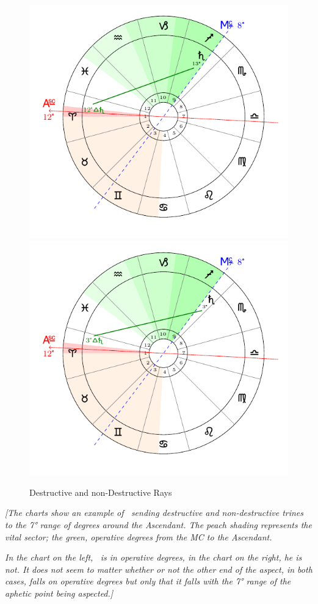 \begin{figure}[H]
\includegraphics[width=.48\textwidth]{charts/3_03_3a}
\includegraphics[width=.48\textwidth]{charts/3_03_3b}
\caption{Destructive and non-Destructive Rays}
\end{figure}

\textsl{[The charts show an example of \Saturn\, sending destructive and non-destructive trines to the 7° range of degrees around the Ascendant. The peach shading represents the vital sector; the green, operative degrees from the MC to the Ascendant.}

\textsl{In the chart on the left, \Saturn\, is in operative degrees, in the chart on the right, he is not. It does not seem to matter whether or not the other end of the aspect, in both cases, falls on operative degrees but only that it falls with the 7° range of the aphetic point being aspected.]}

\newpage
